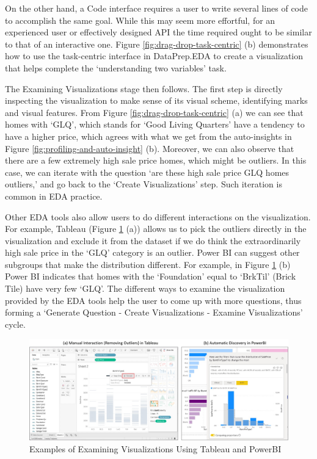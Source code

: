 \documentclass[11pt]{article}
\newcommand{\stitle}[1]{ \noindent{\bf #1.\xspace}}
\begin{document}
On the other hand, a Code interface requires a user to write several lines of code to accomplish the same goal. While this may seem more effortful, for an experienced user or effectively designed API the time required ought to be similar to that of an interactive one. Figure \ref{fig:drag-drop-task-centric} (b) demonstrates how to use the task-centric interface in DataPrep.EDA to create a visualization that helps complete the `understanding two variables' task.



\stitle{Examine Visualizations}
The Examining Visualizations stage then follows. The first step is directly inspecting the visualization to make sense of its visual scheme, identifying marks and visual features. From Figure \ref{fig:drag-drop-task-centric} (a) we can see that homes with `GLQ', which stands for `Good Living Quarters' have a tendency to have a higher price, which agrees with what we get from the auto-insights in Figure \ref{fig:profiling-and-auto-insight} (b). Moreover, we can also observe that there are a few extremely high sale price homes, which might be outliers. In this case, we can iterate with the question `are these high sale price GLQ homes outliers,' and go back to the `Create Visualizations' step. Such iteration is common in EDA practice.

Other EDA tools also allow users to do different interactions on the visualization. For example, Tableau (Figure \ref{fig:manual-interaction-auto-discovery} (a)) allows us to pick the outliers directly in the visualization and exclude it from the dataset if we do think the extraordinarily high sale price in the `GLQ' category is an outlier. Power BI can suggest other subgroups that make the distribution different. For example, in Figure \ref{fig:manual-interaction-auto-discovery} (b) Power BI indicates that homes with the `Foundation' equal to `BrkTil' (Brick Tile) have very few `GLQ'. The different ways to examine the visualization provided by the EDA tools help the user to come up with more questions, thus forming a `Generate Question - Create Visualizations - Examine Visualizations' cycle.


\begin{figure}[h]
\centering
\includegraphics[width=\textwidth]{figs/manual-interaction-auto-discovery.pdf}
\caption{Examples of Examining Visualizations Using Tableau and PowerBI}
\label{fig:manual-interaction-auto-discovery}
\end{figure}
\end{document}

